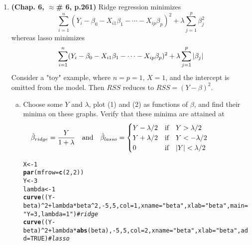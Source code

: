 \documentclass[12pt]{article}\usepackage[]{graphicx}\usepackage[]{color}
\makeatletter
\newcommand{\hlnum}[1]{\textcolor[rgb]{0.686,0.059,0.569}{#1}}%
\newcommand{\hlstr}[1]{\textcolor[rgb]{0.192,0.494,0.8}{#1}}%
\newcommand{\hlcom}[1]{\textcolor[rgb]{0.678,0.584,0.686}{\textit{#1}}}%
\newcommand{\hlopt}[1]{\textcolor[rgb]{0,0,0}{#1}}%
\newcommand{\hlstd}[1]{\textcolor[rgb]{0.345,0.345,0.345}{#1}}%
\newcommand{\hlkwb}[1]{\textcolor[rgb]{0.69,0.353,0.396}{#1}}%
\newcommand{\hlkwc}[1]{\textcolor[rgb]{0.333,0.667,0.333}{#1}}%
\newcommand{\hlkwd}[1]{\textcolor[rgb]{0.737,0.353,0.396}{\textbf{#1}}}%
\newenvironment{kframe}{%
 \def\at@end@of@kframe{}%
 \ifinner\ifhmode%
  \def\at@end@of@kframe{\end{minipage}}%
  \begin{minipage}{\columnwidth}%
 \fi\fi%
 \def\FrameCommand##1{\hskip\@totalleftmargin \hskip-\fboxsep
 \colorbox{shadecolor}{##1}\hskip-\fboxsep
     \hskip-\linewidth \hskip-\@totalleftmargin \hskip\columnwidth}%
 \MakeFramed {\advance\hsize-\width
   \@totalleftmargin\z@ \linewidth\hsize
   \@setminipage}}%
 {\par\unskip\endMakeFramed%
 \at@end@of@kframe}
\newenvironment{knitrout}{}{} %
\theoremstyle{definition}
\makeatother
\begin{document}
\begin{enumerate}[1.]
  \item \textbf{(Chap. 6, $\approx$\# 6, p.261)} Ridge regression minimizes
    \begin{equation}
      \sum^{n}_{i=1}(Y_i-\beta_0-X_{i1}\beta_1-\cdots-X_{ip}\beta_p)^2 + \lambda \sum^{p}_{j=1}\beta_j^2
    \end{equation}
    whereas lasso minimizes\\
    \begin{equation}
      \sum^{n}_{i=1}(Y_i-\beta_0-X_{i1}\beta_1-\cdots-X_{ip}\beta_p)^2 + \lambda \sum^{p}_{j=1}|\beta_j|\\
    \end{equation}
    Consider a "toy" example, where $n = p = 1$, $X = 1$, and the intercept is omitted from the model. Then $RSS$ reduces to $RSS = (Y - \beta)^2$.
    \begin{enumerate}[(a)]
      \item Choose some $Y$ and $\lambda$, plot (1) and (2) as functions of $\beta$, and find their minima on these graphs. Verify that these minima are attained at
      \begin{equation}
        \hspace*{-50pt}\hat{\beta}_{ridge} = \frac{Y}{1+\lambda}\quad \text{and}\quad \hat{\beta}_{lasso} =\begin{cases}
          Y - \lambda/2 &\text{if} \quad Y > \lambda/2\\
          Y + \lambda/2 &\text{if} \quad Y < -\lambda/2\\
          0 &\text{if} \quad |Y| < \lambda/2
        \end{cases}
      \end{equation}
\begin{knitrout}
\color{fgcolor}\begin{kframe}
\begin{alltt}
\hlstd{X} \hlkwb{<-} \hlnum{1}
\hlkwd{par}\hlstd{(}\hlkwc{mfrow} \hlstd{=} \hlkwd{c}\hlstd{(}\hlnum{2}\hlstd{,}\hlnum{2}\hlstd{))}
\hlstd{Y} \hlkwb{<-} \hlnum{3}
\hlstd{lambda} \hlkwb{<-} \hlnum{1}
\hlkwd{curve}\hlstd{((Y} \hlopt{-} \hlstd{beta)}\hlopt{^}\hlnum{2} \hlopt{+} \hlstd{lambda}\hlopt{*}\hlstd{beta}\hlopt{^}\hlnum{2}\hlstd{,} \hlopt{-}\hlnum{5}\hlstd{,} \hlnum{5}\hlstd{,} \hlkwc{col} \hlstd{=}\hlnum{1}\hlstd{,} \hlkwc{xname} \hlstd{=} \hlstr{"beta"}\hlstd{,} \hlkwc{xlab}\hlstd{=}\hlstr{"beta"}\hlstd{,} \hlkwc{main}\hlstd{=}\hlstr{"Y=3, lambda=1"}\hlstd{)} \hlcom{# ridge}
\hlkwd{curve}\hlstd{((Y} \hlopt{-} \hlstd{beta)}\hlopt{^}\hlnum{2} \hlopt{+} \hlstd{lambda}\hlopt{*}\hlkwd{abs}\hlstd{(beta),} \hlopt{-}\hlnum{5}\hlstd{,} \hlnum{5}\hlstd{,} \hlkwc{col} \hlstd{=}\hlnum{2}\hlstd{,} \hlkwc{xname} \hlstd{=} \hlstr{"beta"}\hlstd{,} \hlkwc{xlab}\hlstd{=}\hlstr{"beta"}\hlstd{,} \hlkwc{add} \hlstd{=} \hlnum{TRUE}\hlstd{)} \hlcom{# lasso}

\end{alltt}
\end{kframe}
\end{knitrout}
\end{enumerate}
\end{enumerate}
\end{document}
